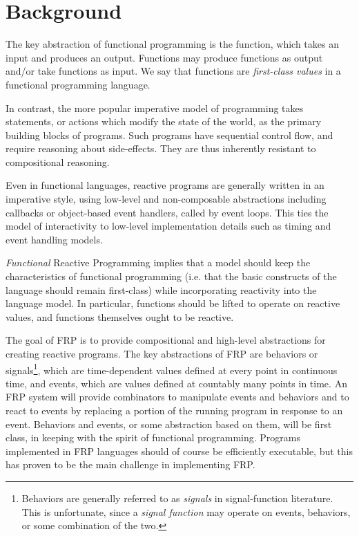 \chapter{Background}
\label{chapter:Background}

The key abstraction of functional programming is the function, which takes an
input and produces an output. Functions may produce functions as output and/or
take functions as input. We say that functions are {\em first-class values} in a
functional programming language.

In contrast, the more popular imperative model of programming takes statements,
or actions which modify the state of the world, as the primary building blocks
of programs. Such programs have sequential control flow, and require reasoning
about side-effects. They are thus inherently resistant to compositional
reasoning.

Even in functional languages, reactive programs are generally written in an imperative style, using low-level and non-composable abstractions including callbacks
or object-based event handlers, called by event loops. This ties the model of interactivity to low-level implementation details such as timing and event handling models. 

{\em Functional} Reactive Programming implies that a model should keep the characteristics of functional programming (i.e. that the basic constructs of the language
should remain first-class) while incorporating reactivity into the language model. In particular, functions should be lifted to operate on reactive values,
and functions themselves ought to be reactive.

The goal of FRP is to provide compositional and high-level abstractions for
creating reactive programs. The key abstractions of FRP are behaviors or
signals\footnote{Behaviors are generally referred to as {\em signals} in
signal-function literature. This is unfortunate, since a {\em signal function}
may operate on events, behaviors, or some combination of the two.}, which are
time-dependent values defined at every point in continuous time, and events,
which are values defined at countably many points in time. An FRP system will
provide combinators to manipulate events and behaviors and to react to events by
replacing a portion of the running program in response to an event. Behaviors
and events, or some abstraction based on them, will be first class, in keeping
with the spirit of functional programming. Programs implemented in FRP languages
should of course be efficiently executable, but this has proven to be the main
challenge in implementing FRP.

